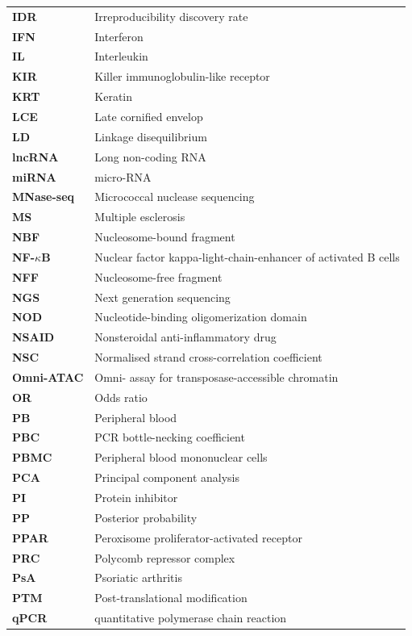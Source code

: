 \begin{longtable}{p{2.5cm}p{12.5cm}}
\textbf{IDR} & Irreproducibility discovery rate\\
\textbf{IFN} & Interferon\\
\textbf{IL} & Interleukin\\
\textbf{KIR} & Killer immunoglobulin-like receptor\\
\textbf{KRT} & Keratin\\
\textbf{LCE} & Late cornified envelop\\
\textbf{LD} & Linkage disequilibrium\\
\textbf{lncRNA} & Long non-coding RNA\\
\textbf{miRNA} & micro-RNA\\
\textbf{MNase-seq} & Micrococcal nuclease sequencing \\
\textbf{MS} & Multiple esclerosis\\
\textbf{NBF} & Nucleosome-bound fragment\\
\textbf{NF-$\kappa$B} & Nuclear factor kappa-light-chain-enhancer of activated B cells \\
\textbf{NFF} & Nucleosome-free fragment\\
\textbf{NGS} & Next generation sequencing\\
\textbf{NOD} & Nucleotide-binding oligomerization domain \\
\textbf{NSAID} & Nonsteroidal anti-inflammatory drug \\
\textbf{NSC}   & Normalised strand cross-correlation coefficient \\
\textbf{Omni-ATAC} & Omni- assay for transposase-accessible chromatin\\
\textbf{OR} & Odds ratio \\
\textbf{PB} & Peripheral blood \\
\textbf{PBC} & PCR bottle-necking coefficient\\
\textbf{PBMC} & Peripheral blood mononuclear cells \\
\textbf{PCA} & Principal component analysis  \\
\textbf{PI} & Protein inhibitor \\
\textbf{PP} & Posterior probability\\
\textbf{PPAR} & Peroxisome proliferator-activated receptor \\
\textbf{PRC} & Polycomb repressor complex\\
\textbf{PsA}  &Psoriatic arthritis  \\
\textbf{PTM} & Post-translational modification\\
\textbf{qPCR} & quantitative polymerase chain reaction \\

\end{longtable}
